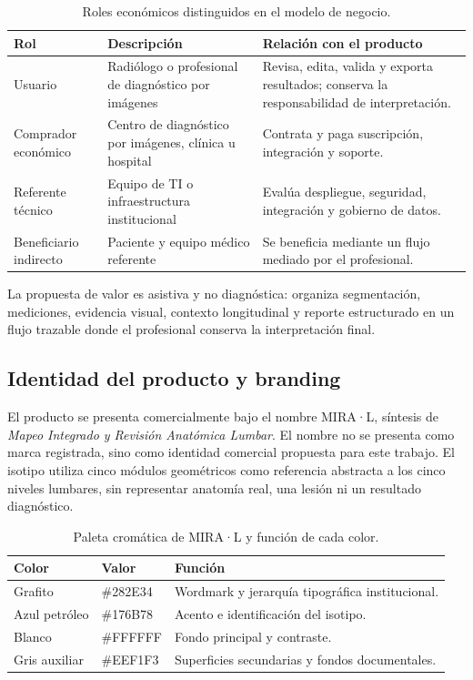 {\small
\begin{longtable}{>{\raggedright\arraybackslash}p{} >{\raggedright\arraybackslash}p{} >{\raggedright\arraybackslash}p{}}
\caption{Roles económicos distinguidos en el modelo de negocio.}\label{tab:negocio-roles}\\
\hline
\textbf{Rol} & \textbf{Descripción} & \textbf{Relación con el producto} \\
\hline
\endfirsthead
Usuario & Radiólogo o profesional de diagnóstico por imágenes & Revisa, edita, valida y exporta resultados; conserva la responsabilidad de interpretación. \\
Comprador económico & Centro de diagnóstico por imágenes, clínica u hospital & Contrata y paga suscripción, integración y soporte. \\
Referente técnico & Equipo de TI o infraestructura institucional & Evalúa despliegue, seguridad, integración y gobierno de datos. \\
Beneficiario indirecto & Paciente y equipo médico referente & Se beneficia mediante un flujo mediado por el profesional. \\
\hline
\end{longtable}
}

La propuesta de valor es asistiva y no diagnóstica: organiza segmentación, mediciones, evidencia visual, contexto longitudinal y reporte estructurado en un flujo trazable donde el profesional conserva la interpretación final.

\subsection{Identidad del producto y branding}

El producto se presenta comercialmente bajo el nombre MIRA·L, síntesis de \textit{Mapeo Integrado y Revisión Anatómica Lumbar}. El nombre no se presenta como marca registrada, sino como identidad comercial propuesta para este trabajo. El isotipo utiliza cinco módulos geométricos como referencia abstracta a los cinco niveles lumbares, sin representar anatomía real, una lesión ni un resultado diagnóstico.

{\small
\begin{longtable}{>{\raggedright\arraybackslash}p{} >{\raggedright\arraybackslash}p{} >{\raggedright\arraybackslash}p{}}
\caption{Paleta cromática de MIRA·L y función de cada color.}\label{tab:negocio-paleta}\\
\hline
\textbf{Color} & \textbf{Valor} & \textbf{Función} \\
\hline
Grafito & \#282E34 & Wordmark y jerarquía tipográfica institucional. \\
Azul petróleo & \#176B78 & Acento e identificación del isotipo. \\
Blanco & \#FFFFFF & Fondo principal y contraste. \\
Gris auxiliar & \#EEF1F3 & Superficies secundarias y fondos documentales. \\
\hline
\end{longtable}
}

